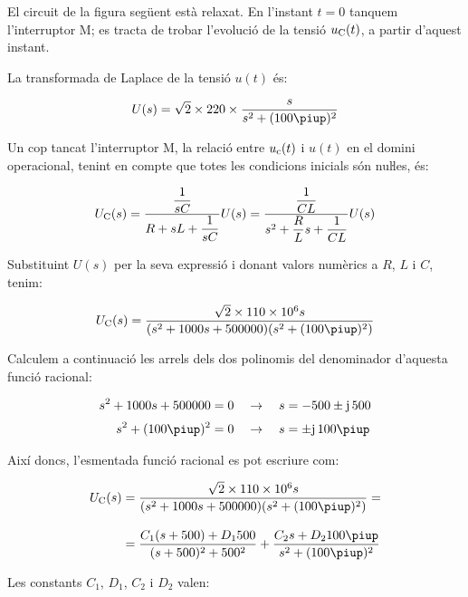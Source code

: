 \begin{exemple}
\label{ex:laplace}
    El circuit de la figura següent està relaxat. En l'instant $t=0$
    tanquem l'interruptor M; es tracta de trobar l'evolució de la tensió
    $u_\mathrm{C}(t)$, a partir d'aquest instant.

    \begin{center}
        
    \end{center}

    La transformada de Laplace de la tensió $u(t)$ és:

    \[
        U(s) = \sqrt{2}\times 220\times \frac{s}{s^2 + (100\piup)^2}
    \]

    Un cop tancat l'interruptor M, la relació entre $u_\mathrm{c}(t)$ i
    $u(t)$ en el domini operacional, tenint en compte que totes les
    condicions inicials són nuŀles, és:

    \[
        U_\mathrm{C}(s) = \frac{\dfrac{1}{sC}}{R+ sL +\dfrac{1}{sC}} U(s)=
        \frac{\dfrac{1}{CL}}{s^2 + \dfrac{R}{L}s +\dfrac{1}{CL}} U(s)
    \]

    Substituint $U(s)$ per la seva expressió i donant valors numèrics a
    $R$, $L$ i $C$, tenim:

    \[
        U\ped{C}(s) = \frac{\sqrt{2}\times 110\times 10^6 s}{(s^2 + 1000 s + 500000)(s^2 + (100\piup)^2)}
    \]

    Calculem a continuació les arrels dels dos polinomis  del
    denominador d'aquesta funció racional:

    \begin{align*}
        s^2 + 1000 s + 500000 &= 0 \quad\rightarrow\quad s = -500
        \pm\ju\,500 \\[0.5ex]
        s^2 + (100\piup)^2 &= 0 \quad\rightarrow\quad s = \pm\ju\,100\piup
    \end{align*}

    Així doncs, l'esmentada funció racional es pot escriure com:

    \[\begin{split}
    U\ped{C}(s) &= \frac{\sqrt{2}\times 110\times 10^6 s}{(s^2 + 1000 s +
    500000)(s^2 + (100\piup)^2)}  = \\[2ex] &= \frac{C_1 (s+500) + D_1
    500}{(s+500)^2+500^2} + \frac{C_2 s + D_2 100 \piup}{s^2 +(100\piup)^2}
    \end{split}\]

    Les constants $C_1$, $D_1$,  $C_2$ i $D_2$ valen:


\end{exemple}

